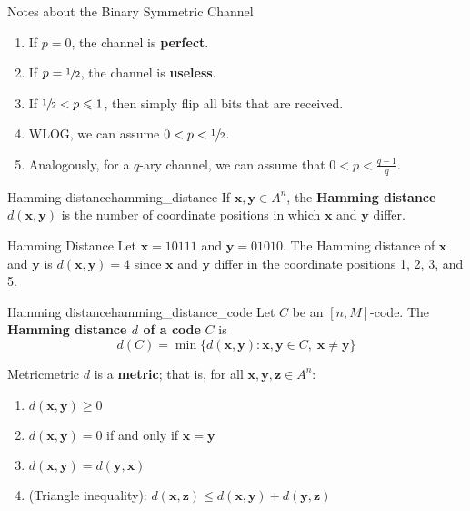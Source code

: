 \begin{Definition}{Notes about the Binary Symmetric Channel}{}
    \begin{enumerate}[label=(\Roman*)]
        \item If $ p=0 $, the channel is \textbf{perfect}.
        \item If $ p=\sfrac{1}{2} $, the channel is \textbf{useless}.
        \item If $ \sfrac{1}{2}<p\leqslant 1 $, then simply flip all bits that are received.
        \item WLOG, we can assume $ 0<p<\sfrac{1}{2} $.
        \item Analogously, for a $ q $-ary channel, we can assume that $ 0<p<\frac{q-1}{q} $.
    \end{enumerate}
\end{Definition}

\begin{Definition}{Hamming distance}{hamming_distance}
    If $ \bm{x},\bm{y}\in A^n $, the \textbf{Hamming distance} $ d(\bm{x},\bm{y}) $ is
    the number of coordinate positions in which $ \bm{x} $ and $ \bm{y} $ differ.
\end{Definition}

\begin{Example}{Hamming Distance}{}
    Let $ \bm{x} = 10111 $ and $ \bm{y} = 01010 $. The Hamming distance
    of $ \bm{x} $ and $ \bm{y} $ is $  d(\bm{x},\bm{y})=4  $
    since $ \bm{x} $ and $ \bm{y} $ differ in the coordinate positions
    1, 2, 3, and 5.
\end{Example}

\begin{Definition}{Hamming distance}{hamming_distance_code}
    Let $ C $ be an $ [n,M] $-code.
    The \textbf{Hamming distance $ d $ of a code} $ C $ is
    \[ d(C)=\min \{d(\bm{x},\bm{y}):\bm{x},\bm{y}\in C,\;\bm{x}\neq \bm{y}\} \]
\end{Definition}

\begin{Theorem}{Metric}{metric}
    $ d $ is a \textbf{metric}; that is, for all $ \bm{x},\bm{y},\bm{z}\in A^n $:
    \begin{enumerate}[label=(\arabic*)]
        \item\label{thm:metric:1} $ d(\bm{x},\bm{y})\geqslant 0 $
        \item\label{thm:metric:2} $ d(\bm{x},\bm{y})=0 $ if and only if
              $ \bm{x}=\bm{y} $
        \item\label{thm:metric:3} $ d(\bm{x},\bm{y})=d(\bm{y},\bm{x}) $
        \item\label{thm:metric:4} (Triangle inequality): $ d(\bm{x},\bm{z})\leqslant
                  d(\bm{x},\bm{y})+d(\bm{y},\bm{z}) $
    \end{enumerate}
\end{Theorem}

